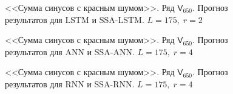 \documentclass[specialist,
               substylefile = spbu.rtx,
               subf,href,colorlinks=true, 12p]{disser}
\begin{document}
\begin{figure}[H]
	\captionsetup{justification=centering}
	\caption{<<Сумма синусов с красным шумом>>. Ряд $\mathsf{V}_{650}$. Прогноз результатов для LSTM и SSA-LSTM. $L = 175, \; r = 2$}
	\label{serr_r2_res_lstm}
\end{figure}

\begin{figure}[H]
	\captionsetup{justification=centering}
	\caption{<<Сумма синусов с красным шумом>>. Ряд $\mathsf{V}_{650}$. Прогноз результатов для ANN и SSA-ANN. $L = 175, \; r = 4$}
\end{figure}

\begin{figure}[H]
	\captionsetup{justification=centering}
	\caption{<<Сумма синусов с красным шумом>>. Ряд $\mathsf{V}_{650}$. Прогноз результатов для RNN и SSA-RNN. $L = 175, \; r = 4$}
\end{figure}
\end{document}
